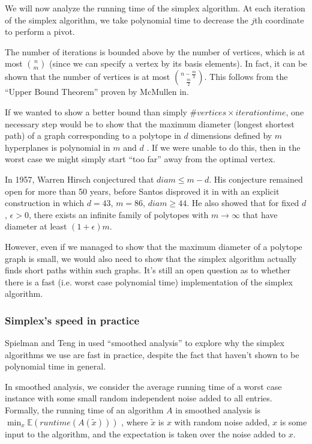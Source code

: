 \documentclass[11pt]{article}
\begin{document}
We will now analyze the running time of the simplex algorithm. At
each iteration of the simplex algorithm, we take polynomial time to
decrease the $j$th coordinate to perform a pivot. 

The number of iterations is bounded above by the number of vertices,
which is at most $\binom{n}{m}$ (since we can specify a vertex by
its basis elements). In fact, it can be shown that the number of vertices
is at most $\binom{n-\frac{m}{2}}{\frac{m}{2}}$. This follows from
the ``Upper Bound Theorem'' proven by McMullen in\cite{McMullen71}.

If we wanted to show a better bound than simply $\#vertices\times iterationtime$,
one necessary step would be to show that the maximum diameter (longest
shortest path) of a graph corresponding to a polytope in $d$ dimensions
defined by $m$ hyperplanes is polynomial in $m$ and $d$ . If we
were unable to do this, then in the worst case we might simply start
``too far'' away from the optimal vertex.

In 1957, Warren Hirsch conjectured that $diam\leq m-d$. His conjecture
remained open for more than 50 years, before Santos disproved it in
\cite{Santos11} with an explicit construction in which $d=43$, $m=86$,
$diam\geq44$. He also showed that for fixed $d$, $\epsilon>0$,
there exists an infinite family of polytopes with $m\rightarrow\infty$
that have diameter at least $(1+\epsilon)m$.

However, even if we managed to show that the maximum diameter of a
polytope graph is small, we would also need to show that the simplex
algorithm actually finds short paths within such graphs. It's still
an open question as to whether there is a fast (i.e. worst case polynomial
time) implementation of the simplex algorithm.


\subsubsection{Simplex's speed in practice}

Spielman and Teng in \cite{SpielmanT2014} used ``smoothed analysis''
to explore why the simplex algorithms we use are fast in practice,
despite the fact that haven't shown to be polynomial time in general.

In smoothed analysis, we consider the average running time of a worst
case instance with some small random independent noise added to all
entries. Formally, the running time of an algorithm $A$ in smoothed
analysis is $\min_{x}\mathbb{E}(runtime(A(\tilde{x})))$ , where $\tilde{x}$
is $x$ with random noise added, $x$ is some input to the algorithm,
and the expectation is taken over the noise added to $x$.
\end{document}
